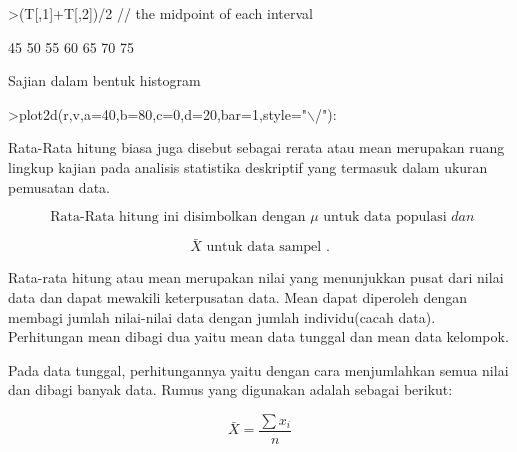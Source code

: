 \documentclass[a4paper,10pt]{article}
\begin{document}
\begin{eulernotebook}
\begin{eulerprompt}
>(T[,1]+T[,2])/2 // the midpoint of each interval 
\end{eulerprompt}
\begin{euleroutput}
             45 
             50 
             55 
             60 
             65 
             70 
             75 
\end{euleroutput}
\begin{eulercomment}
Sajian dalam bentuk histogram
\end{eulercomment}
\begin{eulerprompt}
>plot2d(r,v,a=40,b=80,c=0,d=20,bar=1,style="\(\backslash\)/"):
\end{eulerprompt}
\begin{eulercomment}
Rata-Rata hitung biasa juga disebut sebagai rerata atau mean merupakan
ruang lingkup kajian pada analisis statistika deskriptif yang termasuk
dalam ukuran pemusatan data.\\
\end{eulercomment}
\begin{eulerformula}
\[
\mbox{ Rata-Rata hitung ini disimbolkan dengan } {\mu} \mbox{ untuk data populasi } dan
\]
\end{eulerformula}
\begin{eulerformula}
\[
\bar {X} \mbox{ untuk data sampel }.
\]
\end{eulerformula}
\begin{eulercomment}
Rata-rata hitung atau mean merupakan nilai yang menunjukkan pusat dari
nilai data dan dapat mewakili keterpusatan data. Mean dapat diperoleh
dengan membagi jumlah nilai-nilai data dengan jumlah individu(cacah
data). Perhitungan mean dibagi dua yaitu mean data tunggal dan mean
data kelompok.\\
\end{eulercomment}
\begin{eulercomment}
Pada data tunggal, perhitungannya yaitu dengan cara menjumlahkan semua
nilai dan dibagi banyak data. Rumus yang digunakan adalah sebagai
berikut:\\
\end{eulercomment}
\begin{eulerformula}
\[
\bar{X} = \frac{\sum x_i}{n}
\]
\end{eulerformula}
\begin{eulerformula}

\end{eulerformula}
\end{eulernotebook}
\end{document}
